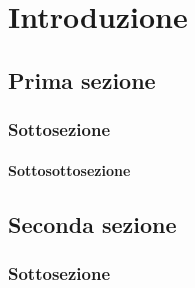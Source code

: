 \chapter{Introduzione}

\lipsum[66]


\section{Prima sezione}

\lipsum[66]


\subsection{Sottosezione}

\lipsum[66]

\subsubsection{Sottosottosezione}

\lipsum[66]


\section{Seconda sezione}

\lipsum[66]

\subsection{Sottosezione}

\lipsum[66]